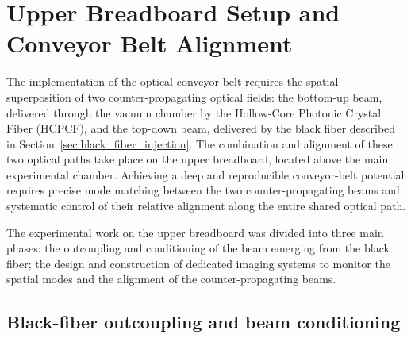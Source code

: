 \providecommand{\tocomplete}[1]{\textbf{[TODO: #1]}}

\section{Upper Breadboard Setup and Conveyor Belt Alignment}
\label{sec:upper_breadboard}

The implementation of the optical conveyor belt requires the spatial superposition of two counter-propagating optical fields: the bottom-up beam, delivered through the vacuum chamber by the Hollow-Core Photonic Crystal Fiber (HCPCF), and the top-down beam, delivered by the black fiber described in Section~\ref{sec:black_fiber_injection}. The combination and alignment of these two optical paths take place on the upper breadboard, located above the main experimental chamber. Achieving a deep and reproducible conveyor-belt potential requires precise mode matching between the two counter-propagating beams and systematic control of their relative alignment along the entire shared optical path.

The experimental work on the upper breadboard was divided into three main phases: the outcoupling and conditioning of the beam emerging from the black fiber; the design and construction of dedicated imaging systems to monitor the spatial modes and the alignment of the counter-propagating beams.

\subsection{Black-fiber outcoupling and beam conditioning}
\label{subsec:upper_outcoupling}

